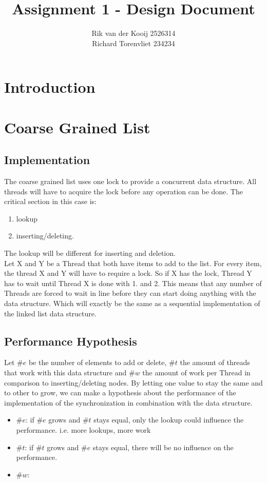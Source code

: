 \documentclass[10pt,a4paper]{article}
\author{Rik van der Kooij 2526314\\Richard Torenvliet 234234}
\title{Assignment 1 - Design Document}
\begin{document}
\maketitle

\section{Introduction}


\section{Coarse Grained List}
\subsection{Implementation}
    The coarse grained list uses one lock to provide a concurrent data structure. All threads will have to acquire the lock before any operation can be done. 
    The critical section in this case is: 
        \begin{enumerate}
        \item lookup
        \item inserting/deleting.
        \end{enumerate}
    The lookup will be different for inserting and deletion.
    \\
    Let X and Y be a Thread that both have items to add to the list. For every
    item, the thread X and Y will have to require a lock. So
    if X has the lock, Thread Y has to wait until Thread X is 
    done with 1. and 2.
    This means that any number of Threads are forced to wait in line before they can start
    doing anything with the data structure. Which will exactly be the same
    as a sequential implementation of the linked list data structure.

\subsection{Performance Hypothesis}
Let $\#e$ be the number of elements to add or delete, $\#t$ the amount of threads
that work with this data structure and $\#w$ the amount of work per Thread in
comparison to inserting/deleting nodes. By letting one value to stay the same
and to other to grow, we can make a hypothesis about the performance of the
implementation of the synchronization in combination with the data structure.
\begin{itemize}
\item $\#e$: if $\#e$ grows and $\#t$ stays equal, only the lookup could influence the performance.
    i.e. more lookups, more work
 \item $\#t$: if $\#t$ grows and $\#e$ stays equal, there will be no influence on the performance.
 \item $\#w$: 
\end{itemize}
\end{document}
